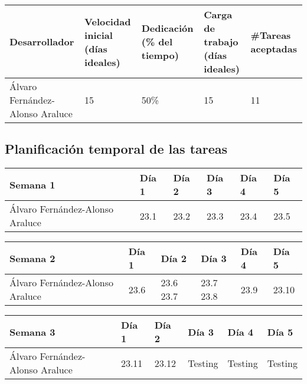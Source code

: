\begin{table}[h]
	\centering
	\begin{tabular}{| p{3cm} | p{2cm} | p{2cm} | p{2cm} | p{2cm} |}
		\rowcolor[HTML]{329A9D} 
		{\color[HTML]{FFFFFF} \textbf{Desarrollador}} & {\color[HTML]{FFFFFF} \textbf{Velocidad inicial (días ideales)}} & {\color[HTML]{FFFFFF} \textbf{Dedicación (\% del tiempo)}} & {\color[HTML]{FFFFFF} \textbf{Carga de trabajo (días ideales)}} & {\color[HTML]{FFFFFF} \textbf{\#Tareas aceptadas}}  \\ \hline
		Álvaro Fernández-Alonso Araluce & 15 & 50\% & 15 & 11 \\ \hline
	\end{tabular}
\end{table}


\subsection{Planificación temporal de las tareas}

\begin{table}[h]
	\centering
	\begin{tabular}{| p{2cm} | p{2cm} | p{2cm} | p{2cm} | p{2cm} | p{2cm} |}
		\rowcolor[HTML]{329A9D} 
		 {\color[HTML]{FFFFFF} \textbf{Semana 1}} & {\color[HTML]{FFFFFF} \textbf{Día 1}} & {\color[HTML]{FFFFFF} \textbf{Día 2}} & {\color[HTML]{FFFFFF} \textbf{Día 3}} & {\color[HTML]{FFFFFF} \textbf{Día 4}}  & {\color[HTML]{FFFFFF} \textbf{Día 5}} \\ \hline
		Álvaro Fernández-Alonso Araluce & 23.1 & 23.2 & 23.3 & 23.4 & 23.5 \\ \hline
	\end{tabular}
\end{table}

\begin{table}[h]
	\centering
	\begin{tabular}{| p{2cm} | p{2cm} | p{2cm} | p{2cm} | p{2cm} | p{2cm} |}
		\rowcolor[HTML]{329A9D} 
		{\color[HTML]{FFFFFF} \textbf{Semana 2}} & {\color[HTML]{FFFFFF} \textbf{Día 1}} & {\color[HTML]{FFFFFF} \textbf{Día 2}} & {\color[HTML]{FFFFFF} \textbf{Día 3}} & {\color[HTML]{FFFFFF} \textbf{Día 4}}  & {\color[HTML]{FFFFFF} \textbf{Día 5}} \\ \hline
		Álvaro Fernández-Alonso Araluce & 23.6 & 23.6 23.7 & 23.7 23.8 & 23.9 & 23.10 \\ \hline
	\end{tabular}
\end{table}

\begin{table}[h]
	\centering
	\begin{tabular}{| p{2cm} | p{2cm} | p{2cm} | p{2cm} | p{2cm} | p{2cm} |}
		\rowcolor[HTML]{329A9D} 
		{\color[HTML]{FFFFFF} \textbf{Semana 3}} & {\color[HTML]{FFFFFF} \textbf{Día 1}} & {\color[HTML]{FFFFFF} \textbf{Día 2}} & {\color[HTML]{FFFFFF} \textbf{Día 3}} & {\color[HTML]{FFFFFF} \textbf{Día 4}}  & {\color[HTML]{FFFFFF} \textbf{Día 5}} \\ \hline
		Álvaro Fernández-Alonso Araluce & 23.11 & 23.12 & Testing & Testing & Testing \\ \hline
	\end{tabular}
\end{table}

